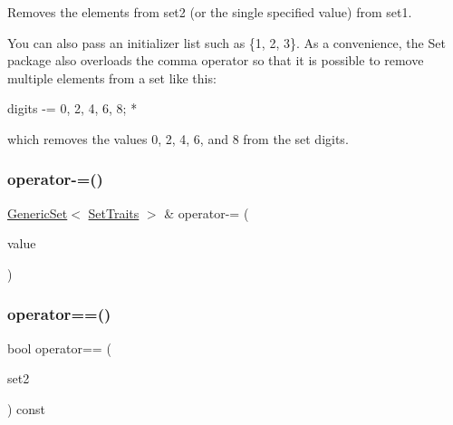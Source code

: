 Removes the elements from {\ttfamily set2} (or the single specified value) from {\ttfamily set1}. 

You can also pass an initializer list such as \{1, 2, 3\}. As a convenience, the {\ttfamily Set} package also overloads the comma operator so that it is possible to remove multiple elements from a set like this\+:


\begin{DoxyPre}
     digits -= 0, 2, 4, 6, 8;
*\end{DoxyPre}


which removes the values 0, 2, 4, 6, and 8 from the set {\ttfamily digits}. \mbox{\label{classstanfordcpplib_1_1collections_1_1GenericSet_a6c4b3d414008341cbea6e24f14a2ee11}} 
\subsubsection{\texorpdfstring{operator-\/=()}{operator-=()}\hspace{0.1cm}{\footnotesize\ttfamily [2/2]}}
{\footnotesize\ttfamily \mbox{\hyperlink{classstanfordcpplib_1_1collections_1_1GenericSet}{Generic\+Set}}$<$ \mbox{\hyperlink{structstanfordcpplib_1_1collections_1_1SetTraits}{Set\+Traits}} $>$ \& operator-\/= (\begin{DoxyParamCaption}\item[{const \mbox{\hyperlink{classstanfordcpplib_1_1collections_1_1GenericSet_a669c81f158766925e7293f97c0099b28}{value\+\_\+type}} \&}]{value }\end{DoxyParamCaption})}

\mbox{\label{classstanfordcpplib_1_1collections_1_1GenericSet_a7f956a22921c1683b74783b055bbb2b5}} 
\subsubsection{\texorpdfstring{operator==()}{operator==()}}
{\footnotesize\ttfamily bool operator== (\begin{DoxyParamCaption}\item[{const \mbox{\hyperlink{classstanfordcpplib_1_1collections_1_1GenericSet}{Generic\+Set}}$<$ \mbox{\hyperlink{structstanfordcpplib_1_1collections_1_1SetTraits}{Set\+Traits}} $>$ \&}]{set2 }\end{DoxyParamCaption}) const}



